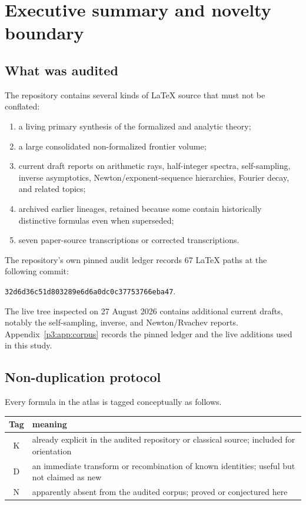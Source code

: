 \documentclass[11pt]{article}
\theoremstyle{definition}
\theoremstyle{remark}
\newcommand{\statusknown}{\textsf{K}}
\newcommand{\statusderived}{\textsf{D}}
\newcommand{\statusnew}{\textsf{N}}
\begin{document}
\tableofcontents
\newpage

\section{Executive summary and novelty boundary}

\subsection{What was audited}

The repository contains several kinds of LaTeX source that must not be conflated:

\begin{enumerate}
\item a living primary synthesis of the formalized and analytic theory;
\item a large consolidated non-formalized frontier volume;
\item current draft reports on arithmetic rays, half-integer spectra, self-sampling,
      inverse asymptotics, Newton/exponent-sequence hierarchies, Fourier decay, and related
      topics;
\item archived earlier lineages, retained because some contain historically distinctive
      formulas even when superseded;
\item seven paper-source transcriptions or corrected transcriptions.
\end{enumerate}

The repository's own pinned audit ledger records 67 LaTeX paths at the following commit:
\begin{center}
\small\texttt{32d6d36c51d803289e6d6a0dc0c37753766eba47}.
\end{center}
The live tree inspected on 27 August 2026 contains additional current drafts, notably the
self-sampling, inverse, and Newton/Rvachev reports.  Appendix~\ref{p3:app:corpus} records the pinned ledger and the live
additions used in this study.

\subsection{Non-duplication protocol}

Every formula in the atlas is tagged conceptually as follows.

\begin{center}
\begin{tabular}{@{}c p{}@{}}
\toprule
Tag & meaning \\
\midrule
\statusknown & already explicit in the audited repository or classical source; included for orientation \\
\statusderived & an immediate transform or recombination of known identities; useful but not claimed as new \\
\statusnew & apparently absent from the audited corpus; proved or conjectured here \\
\bottomrule
\end{tabular}
\end{center}
\end{document}
